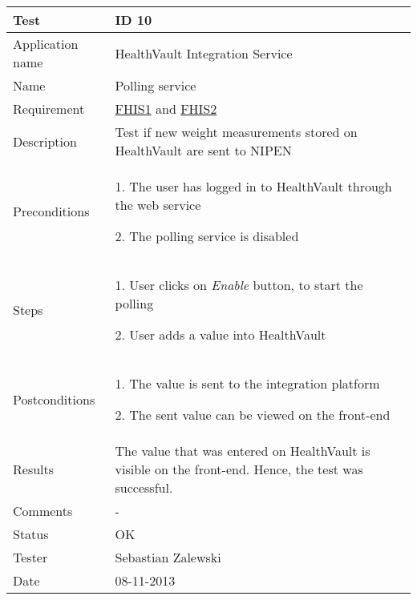 \begin{table}
\begin{center}
\begin{tabular}{ | l | p{10cm} | }
	\hline
	\textbf{Test}	&	\textbf{ID 10} \\
	\hline\noalign{\smallskip}\noalign{\smallskip}\hline
	Application name	& HealthVault Integration Service \\
	Name				& Polling service \\
	Requirement			& \hyperref[table:reqwebservice]{FHIS1} and \hyperref[table:reqwebservice]{FHIS2} \\
	Description			& Test if new weight measurements stored on HealthVault are sent to NIPEN \\
	Preconditions		&	\par 1. The user has logged in to HealthVault through the web service
							\par 2. The polling service is disabled \\
	Steps 				&	\par 1. User clicks on \textit{Enable} button, to start the polling 
							\par 2. User adds a value into HealthVault \\
	Postconditions		&	\par 1. The value is sent to the integration platform
							\par 2. The sent value can be viewed on the front-end \\
	Results				& The value that was entered on HealthVault is visible on the front-end.
						  Hence, the test was successful. \\
	Comments			& - \\
	Status				& OK \\
	Tester				& Sebastian Zalewski \\
	Date				& 08-11-2013 \\
	\hline
\end{tabular}
\end{center}
\end{table}